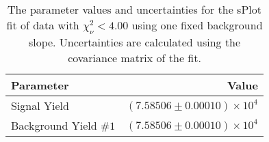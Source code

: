 
\begin{table}[ht]
    \begin{center}
        \begin{tabular}{lr}\toprule
            Parameter & Value \\\midrule
            Signal Yield & $(7.58506 \pm 0.00010) \times 10^{4}$ \\
            Background Yield $\#1$ & $(7.58506 \pm 0.00010) \times 10^{4}$ \\\bottomrule
        \end{tabular}
        \caption{The parameter values and uncertainties for the sPlot fit of data with $\chi^2_\nu < 4.00$ using one fixed background slope. Uncertainties are calculated using the covariance matrix of the fit.}\label{tab:splot-fit-results-chisqdof-4.00-fixed-1}
    \end{center}
\end{table}
